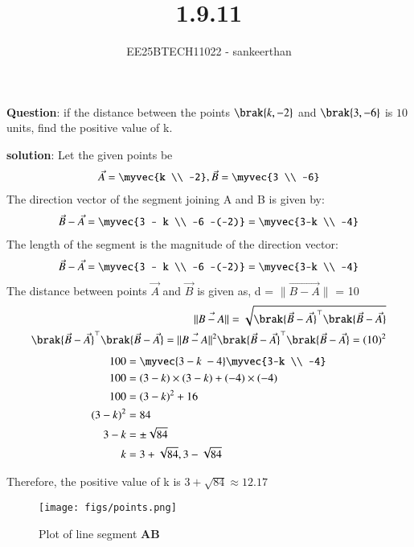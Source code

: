 \documentclass[journal]{IEEEtran}
\begin{document}


\title{1.9.11}
\author{EE25BTECH11022 - sankeerthan}
{\let\newpage\relax\maketitle}

\renewcommand{\thefigure}{\theenumi}
\renewcommand{\thetable}{\theenumi}

\renewcommand{\thetable}{\theenumi}

\textbf{Question}: if the distance between the points $\brak{k,-2}$ and $\brak{3,-6}$ is $10$ units, find the positive value of k.

\textbf{solution}:
Let the given points be
 \begin{align}
 \vec{A} = \myvec{k \\ -2}, \vec{B} = \myvec{3 \\ -6} 
 \end{align}
The direction vector of the segment joining A and B is given by:
\begin{align}
\vec{B} - \vec{A} = \myvec{3 - k \\ -6 -(-2)} = \myvec{3-k \\ -4} 
\end{align}
The length of the segment is the magnitude of the direction vector:
 \begin{align}
\vec{B} - \vec{A} = \myvec{3 - k \\ -6 -(-2)} = \myvec{3-k \\ -4} 
\end{align}
The distance between points $\vec{A}$ and $\vec{B}$ is given as,
d = $\|\vec{B-A}\|$ = 10
\begin{align}
\|\vec{B-A}\| = \sqrt{\brak{\vec{B}-\vec{A}}^\top \brak{\vec{B}-\vec{A}}}  \\
\brak{\vec{B}-\vec{A}}^\top \brak{\vec{B}-\vec{A}} = \|\vec{B-A}\|^2
\brak{\vec{B}-\vec{A}}^\top \brak{\vec{B}-\vec{A}} = (10)^2
\end{align}
\begin{align}
100 &=\myvec{3-k  \ -4}\myvec{3-k \\ -4}\\
100 &=(3-k)\times(3-k)+(-4)\times(-4) \\
100 &=(3-k)^2 + 16 \\
(3-k)^2 &= 84 \\
3-k &=\pm \sqrt{84} \\
k &= 3+\sqrt{84} ,3-\sqrt{84}
\end{align}

Therefore, the positive value of k is $3+\sqrt{84} \approx 12.17$

\begin{figure}
   \centering
   \texttt{[image: figs/points.png]}
   \caption{Plot of line segment \textbf{AB}}
   \label{}
\end{figure}
\end{document}
